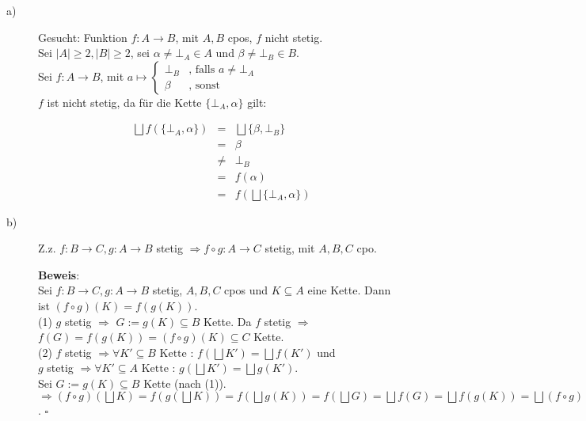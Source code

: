 \documentclass[11pt,a4paper,ngerman]{article}
\begin{document}
\begin{description}
\item[a)] Gesucht: Funktion $f : A \to B$, mit $A,B$ cpos, $f$ nicht stetig. \\
Sei $|A| \geq 2, |B| \geq 2$, sei $\alpha \neq \bot_A \in A$ und $\beta \neq \bot_B \in B$.\\
Sei $f : A \to B$, mit $a \mapsto \begin{cases}
\bot_B & \text{, falls } a \neq \bot_A \\
\beta & \text{, sonst}
\end{cases}$\\
$f$ ist nicht stetig, da für die Kette $\{\bot_A, \alpha \}$ gilt: 

\begin{eqnarray*}
\bigsqcup f(\{\bot_A, \alpha \}) &=& \bigsqcup \{\beta, \bot_B\}\\
&=& \beta \\
&\neq & \bot_B \\
&=& f(\alpha ) \\
&=& f(\bigsqcup \{ \bot_A, \alpha\})
\end{eqnarray*}

\item[b)] Z.z. $f: B \to C, g: A \to B$ stetig $\Rightarrow f \circ g: A \to C$ stetig, mit $A,B,C$ cpo. 

\textbf{Beweis}:\\
Sei $f: B \to C, g: A \to B$ stetig, $A,B,C$ cpos und $K \subseteq A$ eine Kette. Dann ist $(f \circ g)(K) = f(g(K))$. \\
(1) $g$ stetig $\Rightarrow$ $G := g(K) \subseteq B$ Kette. Da $f$ stetig $\Rightarrow$ $f(G) = f(g(K)) = (f \circ g)(K) \subseteq C$ Kette.\\

(2) $f$ stetig $\Rightarrow \forall K' \subseteq  B \text{ Kette }: \, f(\bigsqcup K') = \bigsqcup f(K')$ und\\
$g$ stetig $\Rightarrow \forall K' \subseteq  A \text{ Kette }: \, g(\bigsqcup K') = \bigsqcup g(K')$.\\
Sei $G := g(K) \subseteq B $ Kette (nach (1)).\\
$\Rightarrow (f \circ g)(\bigsqcup K) = f(g(\bigsqcup K)) =f(\bigsqcup g(K)) = f(\bigsqcup G) = \bigsqcup f(G) = \bigsqcup f(g(K)) = \bigsqcup (f \circ g)(K)$.
\mbox{} \hfill $\square$
\end{description}

\pagebreak

\end{document}
